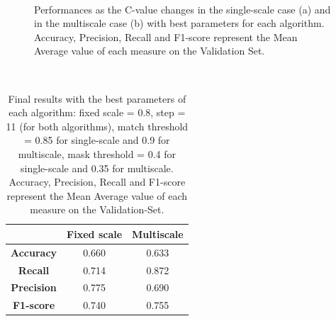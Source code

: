 \documentclass[a4paper,letterpaper, 11pt, onecolumn]{article} %
\begin{document}
\begin{figure}[h!]
\centering
{}\\
\caption{Performances as the C-value changes in the single-scale case (a) and in the multiscale case (b) with best parameters for each algorithm. Accuracy, Precision, Recall and F1-score represent the Mean Average value of each measure on the Validation Set.}
\label{fig:cvalue}
\end{figure}
\
\begin{table}[h!]
\centering
\begin{tabular}{c||c|c}
&\textbf{Fixed scale} & \textbf{Multiscale}\\
\hline \hline 
\textbf{Accuracy} &0.660 & 0.633\\
\textbf{Recall} &0.714  & 0.872\\
\textbf{Precision} & 0.775 & 0.690\\
\textbf{F1-score} & 0.740& 0.755\\
\end{tabular}
\caption{Final results with the best parameters of each algorithm: fixed scale = 0.8, step = 11 (for both algorithms), match threshold = 0.85 for single-scale and 0.9 for multiscale, mask threshold = 0.4 for single-scale and 0.35 for multiscale. Accuracy, Precision, Recall and F1-score represent the Mean Average value of each measure on the Validation-Set. }
\label{tab:res}
\end{table}
\pagebreak
\end{document}

